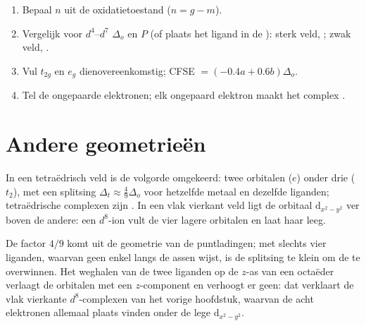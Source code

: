 \begin{method}\label{met:b2:ligand-field:spin-state}
\begin{enumerate}
  \item Bepaal $n$ uit de oxidatietoestand ($n = g - m$).
  \item Vergelijk voor $d^4$--$d^7$ $\Delta_o$ en $P$ (of plaats het ligand in de
        ): sterk veld, ; zwak veld, .
  \item Vul $t_{2g}$ en $e_g$ dienovereenkomstig; CFSE $= (-0.4a + 0.6b)\Delta_o$.
  \item Tel de ongepaarde elektronen; elk ongepaard elektron maakt het complex
        .
\end{enumerate}
\end{method}

\section{Andere geometrieën}

\begin{proposition}\label{prop:b2:ligand-field:tetrahedral}
In een tetraëdrisch veld is de volgorde omgekeerd: twee orbitalen ($e$) onder drie ($t_2$),
met een splitsing $\Delta_t \approx \frac49\Delta_o$ voor hetzelfde metaal en dezelfde liganden; tetraëdrische
complexen zijn . In een vlak vierkant veld ligt de orbitaal $\mathrm d_{x^2-y^2}$ ver
boven de andere: een $d^8$-ion vult de vier lagere orbitalen en laat haar leeg.
\end{proposition}

\admitted

De factor $4/9$ komt uit de geometrie van de puntladingen; met slechts vier liganden,
waarvan geen enkel langs de assen wijst, is de splitsing te klein om de 
te overwinnen. Het weghalen van de twee liganden op de $z$-as van een octaëder verlaagt de orbitalen met
een $z$-component en verhoogt er geen: dat verklaart de vlak vierkante $d^8$-complexen van
het vorige hoofdstuk, waarvan de acht elektronen allemaal plaats vinden onder de lege
$\mathrm d_{x^2-y^2}$.

